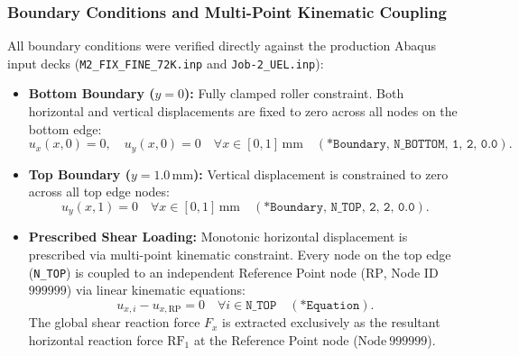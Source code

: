 \subsubsection{Boundary Conditions and Multi-Point Kinematic Coupling}
All boundary conditions were verified directly against the production Abaqus input decks (\nolinkurl{M2_FIX_FINE_72K.inp} and \nolinkurl{Job-2_UEL.inp}):
\begin{itemize}
  \item \textbf{Bottom Boundary ($y = 0$):} Fully clamped roller constraint. Both horizontal and vertical displacements are fixed to zero across all nodes on the bottom edge:
  \begin{equation}
    u_x(x, 0) = 0, \quad u_y(x, 0) = 0 \quad \forall x \in [0, 1]\,\mathrm{mm} \quad (\texttt{*Boundary, N\_BOTTOM, 1, 2, 0.0}).
    \label{eq:mode2_bottom_bc}
  \end{equation}
  \item \textbf{Top Boundary ($y = 1.0\,\mathrm{mm}$):} Vertical displacement is constrained to zero across all top edge nodes:
  \begin{equation}
    u_y(x, 1) = 0 \quad \forall x \in [0, 1]\,\mathrm{mm} \quad (\texttt{*Boundary, N\_TOP, 2, 2, 0.0}).
    \label{eq:mode2_top_uy_bc}
  \end{equation}
  \item \textbf{Prescribed Shear Loading:} Monotonic horizontal displacement is prescribed via multi-point kinematic constraint. Every node on the top edge (\texttt{N\_TOP}) is coupled to an independent Reference Point node ($\mathrm{RP}$, Node ID $999999$) via linear kinematic equations:
  \begin{equation}
    u_{x, i} - u_{x, \mathrm{RP}} = 0 \quad \forall i \in \texttt{N\_TOP} \quad (\texttt{*Equation}).
    \label{eq:mode2_coupling_bc}
  \end{equation}
  The global shear reaction force $F_x$ is extracted exclusively as the resultant horizontal reaction force $\mathrm{RF}_1$ at the Reference Point node ($\mathrm{Node}\ 999999$).
\end{itemize}

